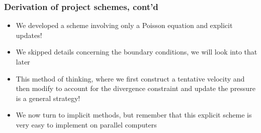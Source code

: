 \begin{frame}
\frametitle{Derivation of project schemes, cont'd}
\begin{itemize}
\item We developed a scheme involving only a Poisson equation and explicit updates!  
\item We skipped details concerning the boundary conditions, we will look into that later
\item This method of thinking, where we first construct a tentative velocity and then 
modify to account for the divergence constraint and update the pressure is a general strategy! 
\item We now turn to implicit methods, but remember that this explicit scheme is very easy
to implement on parallel computers 
\end{itemize}
\end{frame}

